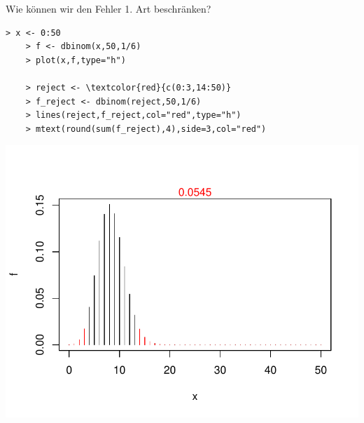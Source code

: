 \documentclass[t,11pt,aspectratio=169]{beamer}
\begin{document}
\begin{frame}[fragile]{Wie können wir den Fehler 1. Art beschränken?}
\begin{minipage}[t]{0.5\textwidth}
	\begin{Verbatim}[fontsize=\small, commandchars=\\\{\}]
	> x <- 0:50
	> f <- dbinom(x,50,1/6)
	> plot(x,f,type="h")
	
	> reject <- \textcolor{red}{c(0:3,14:50)}
	> f_reject <- dbinom(reject,50,1/6)
	> lines(reject,f_reject,col="red",type="h")
	> mtext(round(sum(f_reject),4),side=3,col="red")
	\end{Verbatim}
\end{minipage}
\hfill
\begin{minipage}{0.4\textwidth}
	\includegraphics[width=\textwidth]{Rplot03.pdf}
\end{minipage}
\end{frame}
\end{document}
